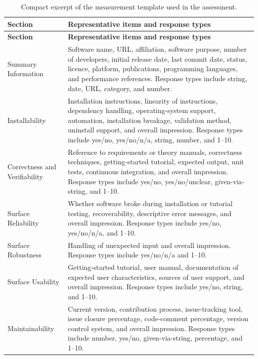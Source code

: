 \documentclass[final,1p,times,authoryear,12pt]{elsarticle}
\begin{document}
\begin{longtable}{p{} p{}}
\caption{Compact excerpt of the measurement template used in
the assessment.}
\label{tab:template-excerpt} \\
\toprule
\textbf{Section} & \textbf{Representative items and response types} \\
\midrule
\endfirsthead

\toprule
\textbf{Section} & \textbf{Representative items and response types} \\
\midrule
\endhead

\bottomrule
\endfoot

Summary Information &
Software name, URL, affiliation, software purpose, number
of developers, initial release date, last commit date,
status, licence, platform, publications, programming
languages, and performance references. Response types
include string, date, URL, category, and number. \\

Installability &
Installation instructions, linearity of instructions,
dependency handling, operating-system support, automation,
installation breakage, validation method, uninstall
support, and overall impression. Response types include
yes/no, yes/no/n/a, string, number, and 1--10. \\

Correctness and Verifiability &
Reference to requirements or theory manuals, correctness
techniques, getting-started tutorial, expected output,
unit tests, continuous integration, and overall
impression. Response types include yes/no,
yes/no/unclear, given-via-string, and 1--10. \\

Surface Reliability &
Whether software broke during installation or tutorial
testing, recoverability, descriptive error messages, and
overall impression. Response types include yes/no,
yes/no/n/a, and 1--10. \\

Surface Robustness &
Handling of unexpected input and overall impression.
Response types include yes/no/n/a and 1--10. \\

Surface Usability &
Getting-started tutorial, user manual, documentation of
expected user characteristics, sources of user support,
and overall impression. Response types include yes/no,
string, and 1--10. \\

Maintainability &
Current version, contribution process, issue-tracking
tool, issue closure percentage, code-comment percentage,
version control system, and overall impression. Response
types include number, yes/no, given-via-string,
percentage, and 1--10. \\


\end{longtable}
\end{document}
